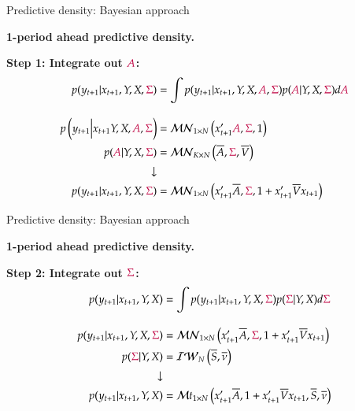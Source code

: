 \documentclass[notes,blackandwhite,mathsans,usenames,dvipsnames]{beamer}
\begin{document}
\begin{frame}{Predictive density: Bayesian approach}

\textbf{1-period ahead predictive density.}

\bigskip\textbf{Step 1: Integrate out ${\color{purple}A}$:}
\begin{align*} 
p(y_{t+1}|x_{t+1},Y,X,{\color{purple}\Sigma}) &= \int p(y_{t+1}|x_{t+1},Y,X,{\color{purple}A},{\color{purple}\Sigma})p({\color{purple}A}|Y,X,{\color{purple}\Sigma}) d{\color{purple}A}\\[2ex]
p\left(y_{t+1}\Big|x_{t+1}Y,X, {\color{purple}A},{\color{purple}\Sigma}\right) &= \mathcal{MN}_{1\times N}\left( x_{t+1}'{\color{purple}A}, {\color{purple}\Sigma}, 1 \right)\\
p({\color{purple}A}|Y,X,{\color{purple}\Sigma}) &= \mathcal{MN}_{K\times N}\left( \overline{A},{\color{purple}\Sigma},\overline{V} \right)\\
\downarrow&\\
p(y_{t+1}|x_{t+1},Y,X,{\color{purple}\Sigma}) &= \mathcal{MN}_{1\times N}\left( x_{t+1}'\overline{A}, {\color{purple}\Sigma}, 1 + x_{t+1}'\overline{V}x_{t+1} \right)
\end{align*} 

\end{frame}



\begin{frame}{Predictive density: Bayesian approach}

\textbf{1-period ahead predictive density.}

\bigskip\textbf{Step 2: Integrate out ${\color{purple}\Sigma}$:}
\begin{align*} 
p(y_{t+1}|x_{t+1},Y,X) &= \int p(y_{t+1}|x_{t+1},Y,X,{\color{purple}\Sigma})p({\color{purple}\Sigma}|Y,X) d{\color{purple}\Sigma}\\[2ex]
p(y_{t+1}|x_{t+1},Y,X,{\color{purple}\Sigma}) &= \mathcal{MN}_{1\times N}\left( x_{t+1}'\overline{A}, {\color{purple}\Sigma}, 1 + x_{t+1}'\overline{V}x_{t+1} \right)\\
p({\color{purple}\Sigma}|Y,X) &= \mathcal{IW}_N\left( \overline{S}, \overline{\nu} \right)\\
\downarrow&\\
p(y_{t+1}|x_{t+1},Y,X) &= \mathcal{M}t_{1\times N}\left( x_{t+1}'\overline{A}, 1 + x_{t+1}'\overline{V}x_{t+1}, \overline{S}, \overline{\nu} \right)
\end{align*} 

\end{frame}
\end{document}
